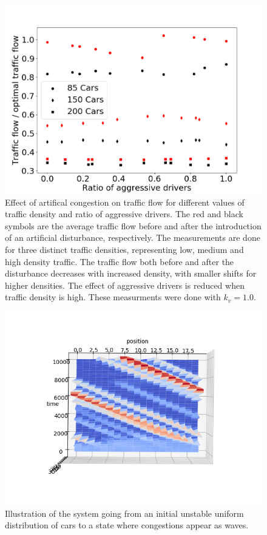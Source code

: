 \documentclass[11pt,a4paper,twocolumn]{article}
\begin{document}
\begin{figure}[ht]     
      \centering
       \includegraphics[scale=0.33]{figs/traffic_density_effect}
       \caption{Effect of artifical congestion on traffic flow for different values of traffic density and ratio of aggressive drivers. The red and black symbols are the average traffic flow before and after the introduction of an artificial disturbance, respectively. The measurements are done for three distinct traffic densities, representing low, medium and high density traffic. The traffic flow both before and after the disturbance decreases with increased density, with smaller shifts for higher densities. The effect of aggressive drivers is reduced  when traffic density is high. These measurments were done with $k_v=1.0$.}
       \label{fig:traffic_density}
 \end{figure}
 
\begin{figure}[t]     
      \centering
       \includegraphics[scale=1, trim={1cm 2.5cm 1cm 3cm}]{figs/phase_transition1.png}
       \caption{Illustration of the system going from an initial unstable uniform distribution of cars to a state where congestions appear as waves.}
       \label{fig:phase_transition}
 \end{figure}
\end{document}
